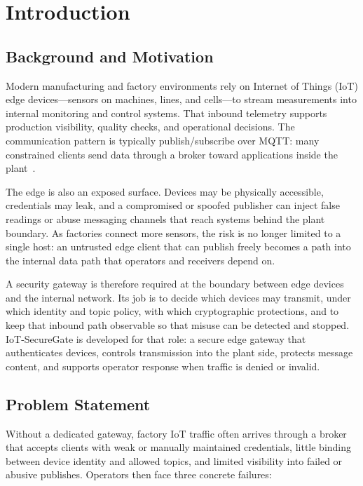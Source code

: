 \documentclass[12pt,a4paper]{report}
\begin{document}
\clearpage
{}


\chapter{Introduction}
\label{ch:introduction}

\section{Background and Motivation}

Modern manufacturing and factory environments rely on
Internet of Things (IoT) edge devices---sensors on
machines, lines, and cells---to stream measurements into
internal monitoring and control systems. That inbound
telemetry supports production visibility, quality checks,
and operational decisions. The communication pattern is
typically publish/subscribe over MQTT: many constrained
clients send data through a broker toward applications
inside the plant~\cite{mqtt}.

The edge is also an exposed surface. Devices may be
physically accessible, credentials may leak, and a
compromised or spoofed publisher can inject false readings
or abuse messaging channels that reach systems behind the
plant boundary. As factories connect more sensors, the
risk is no longer limited to a single host: an untrusted
edge client that can publish freely becomes a path into
the internal data path that operators and receivers depend
on.

A security gateway is therefore required at the boundary
between edge devices and the internal network. Its job is
to decide which devices may transmit, under which
identity and topic policy, with which cryptographic
protections, and to keep that inbound path observable so
that misuse can be detected and stopped. IoT-SecureGate
is developed for that role: a secure edge gateway that
authenticates devices, controls transmission into the
plant side, protects message content, and supports
operator response when traffic is denied or invalid.

\section{Problem Statement}

Without a dedicated gateway, factory IoT traffic often
arrives through a broker that accepts clients with weak
or manually maintained credentials, little binding between
device identity and allowed topics, and limited visibility
into failed or abusive publishes. Operators then face
three concrete failures:
\end{document}
